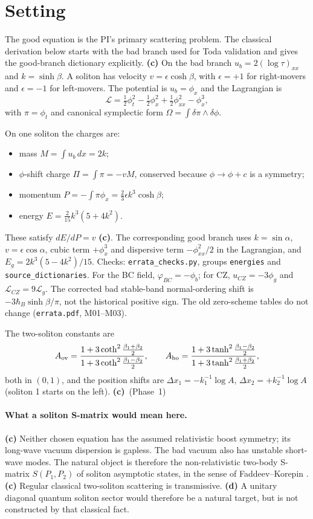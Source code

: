 \documentclass[11pt,a4paper]{article}
\newcommand{\Lc}{\textsf{\textbf{(c)}}\xspace}
\newcommand{\Ld}{\textsf{\textbf{(d)}}\xspace}
\newcommand{\file}[1]{\nolinkurl{#1}}
\theoremstyle{remark}\newtheorem{remark}[proposition]{Remark}
\begin{document}
{\small\tableofcontents}\clearpage

\section{Setting}
The good equation is the PI's primary scattering problem. The classical
derivation below starts with the bad branch used for Toda validation and
gives the good-branch dictionary explicitly.
\Lc On the bad branch $u_b=2(\log\tau)_{xx}$ and $k=\sinh\beta$. A soliton has velocity $v=\epsilon\cosh\beta$, with $\epsilon=+1$ for right-movers and $\epsilon=-1$ for left-movers. The potential is $u_b=\phi_x$ and the Lagrangian is
\[
\mathcal L=\tfrac12\phi_t^2-\tfrac12\phi_x^2+\tfrac12\phi_{xx}^2-\phi_x^3 ,
\]
with $\pi=\phi_t$ and canonical symplectic form $\Omega=\int\delta\pi\wedge\delta\phi$.

On one soliton the charges are:
\begin{itemize}
\item mass $M=\int u_b\,dx=2k$;
\item $\phi$-shift charge $\Pi=\int\pi=-vM$, conserved because $\phi\to\phi+c$ is a symmetry;
\item momentum $P=-\int\pi\phi_x=\tfrac23\epsilon k^3\cosh\beta$;
\item energy $E=\tfrac2{15}k^3(5+4k^2)$.
\end{itemize}
These satisfy $dE/dP=v$ \Lc. The corresponding good branch uses
$k=\sin\alpha$, $v=\epsilon\cos\alpha$, cubic term $+\phi_x^3$ and dispersive
term $-\phi_{xx}^2/2$ in the Lagrangian, and
$E_g=2k^3(5-4k^2)/15$.
Checks: \file{errata_checks.py}, groups \file{energies} and
\file{source_dictionaries}. For the BC field, $\varphi_{BC}=-\phi_b$;
for CZ, $u_{CZ}=-3\phi_g$ and $\mathcal L_{CZ}=9\mathcal L_g$.
The corrected bad stable-band normal-ordering shift is
$-3\hbar_B\sinh\beta/\pi$, not the historical positive sign. The old
zero-scheme tables do not change (\file{errata.pdf}, M01--M03).

The two-soliton constants are
\[
A_{\rm ov}=\frac{1+3\coth^2\frac{\beta_1+\beta_2}{2}}{1+3\coth^2\frac{\beta_1-\beta_2}{2}},\qquad A_{\rm ho}=\frac{1+3\tanh^2\frac{\beta_1-\beta_2}{2}}{1+3\tanh^2\frac{\beta_1+\beta_2}{2}} ,
\]
both in $(0,1)$, and the position shifts are $\Delta x_1=-k_1^{-1}\log A$, $\Delta x_2=+k_2^{-1}\log A$ (soliton 1 starts on the left). \Lc~(Phase~1)

\paragraph{What a soliton S-matrix would mean here.} \Lc Neither chosen equation has the assumed relativistic boost symmetry; its long-wave vacuum dispersion is gapless. The bad vacuum also has unstable short-wave modes. The natural object is therefore the non-relativistic two-body S-matrix $S(P_1,P_2)$ of soliton asymptotic states, in the sense of Faddeev--Korepin \cite{FK}. \Lc Regular classical two-soliton scattering is transmissive. \Ld A unitary diagonal quantum soliton sector would therefore be a natural target, but is not constructed by that classical fact.
\end{document}
